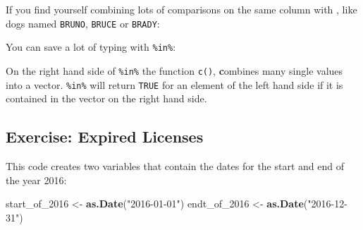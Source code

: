 \documentclass[]{Nemilov}
\newenvironment{Shaded}{\begin{snugshade}}{\end{snugshade}}
\newcommand{\DecValTok}[1]{\textcolor[rgb]{0.00,0.00,0.81}{#1}}
\newcommand{\KeywordTok}[1]{\textcolor[rgb]{0.13,0.29,0.53}{\textbf{#1}}}
\newcommand{\NormalTok}[1]{#1}
\newcommand{\OperatorTok}[1]{\textcolor[rgb]{0.81,0.36,0.00}{\textbf{#1}}}
\newcommand{\StringTok}[1]{\textcolor[rgb]{0.31,0.60,0.02}{#1}}
\begin{document}
If you find yourself combining lots of comparisons on the same column with \texttt{\textbar{}}, like dogs named \texttt{BRUNO}, \texttt{BRUCE} or \texttt{BRADY}:

\begin{Shaded}
\end{Shaded}

You can save a lot of typing with \texttt{\%in\%}:

\begin{Shaded}
\end{Shaded}

On the right hand side of \texttt{\%in\%} the function \texttt{c()}, \textbf{c}ombines many single values into a vector. \texttt{\%in\%} will return \texttt{TRUE} for an element of the left hand side if it is contained in the vector on the right hand side.

\hypertarget{exercise-expired-licenses-1}{%
\subsection{Exercise: Expired Licenses}\label{exercise-expired-licenses-1}}

This code creates two variables that contain the dates for the start and end of the year 2016:

\begin{Shaded}
\begin{Highlighting}[]
\NormalTok{start_of_}\DecValTok{2016}\NormalTok{ <-}\StringTok{ }\KeywordTok{as.Date}\NormalTok{(}\StringTok{"2016-01-01"}\NormalTok{)}
\NormalTok{endt_of_}\DecValTok{2016}\NormalTok{ <-}\StringTok{ }\KeywordTok{as.Date}\NormalTok{(}\StringTok{"2016-12-31"}\NormalTok{)}
\end{Highlighting}
\end{Shaded}
\end{document}
